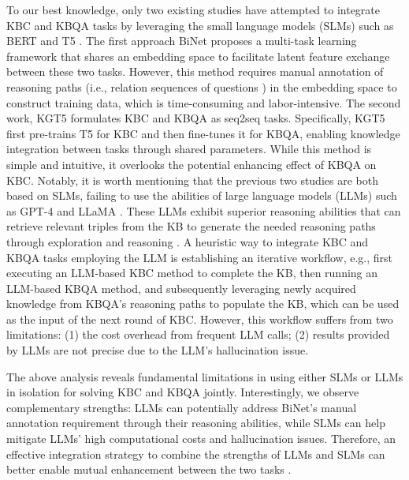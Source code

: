 \documentclass[11pt]{article}
\begin{document}
 To our best knowledge, only two existing studies have attempted to integrate KBC and KBQA tasks by leveraging the small language models (SLMs) such as BERT \cite{DBLP:conf/naacl/DevlinCLT19} and T5 \cite{T5}. The first approach BiNet \cite{lihui2022binet} proposes a multi-task learning framework that shares an embedding space to facilitate latent feature exchange between these two tasks. However, this method requires manual annotation of reasoning paths (i.e., relation sequences of questions \cite{lihui2022binet}) in the embedding space to construct training data, which is time-consuming and labor-intensive. The second work, KGT5 \cite{saxena2022kgt5} formulates KBC and KBQA as seq2seq tasks. Specifically, KGT5 first pre-trains T5 for KBC and then fine-tunes it for KBQA, enabling knowledge integration between tasks through shared parameters. 
 While this method is simple and intuitive, it overlooks the potential enhancing effect of KBQA on KBC. Notably, it is worth mentioning that the previous two studies are both based on SLMs, failing to use the abilities of large language models (LLMs) such as GPT-4 \cite{achiam2023gpt} and LLaMA \cite{touvron2023llama}. These LLMs exhibit superior reasoning abilities that can retrieve relevant triples from the KB to generate the needed reasoning paths through exploration and reasoning \cite{sun2023thinkongraph}. A heuristic way to integrate KBC and KBQA tasks employing the LLM is establishing an iterative workflow, e.g., first executing an LLM-based KBC method to complete the KB, then running an LLM-based KBQA method, and subsequently leveraging newly acquired knowledge from KBQA's reasoning paths to populate the KB, which can be used as the input of the next round of KBC. However, this workflow suffers from two limitations: (1) the cost overhead from frequent LLM calls; (2) results provided by LLMs are not precise due to the LLM's hallucination issue.

The above analysis reveals fundamental limitations in using either SLMs or LLMs in isolation for solving KBC and KBQA jointly. Interestingly, we observe complementary strengths: LLMs can potentially address BiNet's manual annotation requirement through their reasoning abilities, while SLMs can help mitigate LLMs' high computational costs and hallucination issues. Therefore, an effective integration strategy to combine the strengths of LLMs and SLMs can better enable mutual enhancement between the two tasks \cite{DBLP:journals/pvldb/FanGZZCCLMDT24}.


\end{document}
